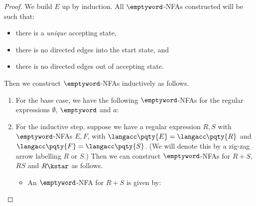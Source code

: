 \begin{proof}
    We build \(E\) up by induction. All \(\emptyword\)-NFAs constructed will be such that:
    \begin{itemize}
        \item there is a \emph{unique} accepting state,
        \item there is no directed edges into the start state, and
        \item there is no directed edges out of accepting state.
    \end{itemize}

    Then we construct \(\emptyword\)-NFAs inductively as follows.

    \begin{enumerate}[label=(\arabic*)]
        \item For the base case, we have the following \(\emptyword\)-NFAs for the regular expressions \(\emptyset\), \(\emptyword\) and \(a\):
        
        \begin{center}
            \hspace{1cm}
            \hspace{1cm}
        \end{center}

        \item For the inductive step. suppose we have a regular expression \(R, S\) with \(\emptyword\)-NFAs \(E, F\), with \(\langacc\pqty{E} = \langacc\pqty{R}\) and \(\langacc\pqty{F} = \langacc\pqty{S}\). (We will denote this by a zig-zag arrow labelling \(R\) or \(S\).) Then we can construct \(\emptyword\)-NFAs for \(R + S\), \(RS\) and \(R\kstar\) as follows.
        \begin{itemize}
            \item An \(\emptyword\)-NFA for \(R + S\) is given by:
            

\end{itemize}
\end{enumerate}
\end{proof}
